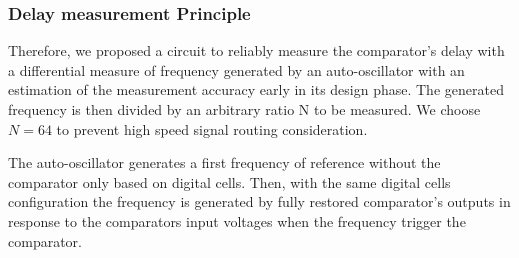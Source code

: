 \subsubsection{Delay measurement Principle}
Therefore, we proposed a circuit to reliably measure the comparator's delay with a differential measure of frequency generated by an auto-oscillator with an estimation of the measurement accuracy early in its design phase. The generated frequency is then divided by an arbitrary ratio N to be measured. We choose $N=64$ to prevent high speed signal routing consideration.

The auto-oscillator generates a first frequency of reference without the comparator only based on digital cells. Then, with the same digital cells configuration the frequency is generated by fully restored comparator's outputs in response to the comparators input voltages when the frequency trigger the comparator.

